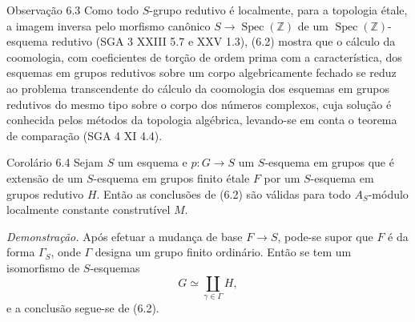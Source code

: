 \begin{statement}{Observação 6.3}
Como todo $S$-grupo redutivo é localmente, para a topologia étale, a imagem inversa pelo morfismo canônico $S\to\operatorname{Spec}(\mathbb Z)$ de um $\operatorname{Spec}(\mathbb Z)$-esquema redutivo (SGA 3 XXIII 5.7 e XXV 1.3), (6.2) mostra que o cálculo da coomologia, com coeficientes de torção de ordem prima com a característica, dos esquemas em grupos redutivos sobre um corpo algebricamente fechado se reduz ao problema transcendente do cálculo da coomologia dos esquemas em grupos redutivos do mesmo tipo sobre o corpo dos números complexos, cuja solução é conhecida pelos métodos da topologia algébrica, levando-se em conta o teorema de comparação (SGA 4 XI 4.4).
\end{statement}

\begin{statement}{Corolário 6.4}
Sejam $S$ um esquema e $p:G\to S$ um $S$-esquema em grupos que é extensão de um $S$-esquema em grupos finito étale $F$ por um $S$-esquema em grupos redutivo $H$. Então as conclusões de (6.2) são válidas para todo $A_S$-módulo localmente constante construtível $M$.
\end{statement}

\emph{Demonstração.} Após efetuar a mudança de base $F\to S$, pode-se supor que $F$ é da forma $\Gamma_S$, onde $\Gamma$ designa um grupo finito ordinário. Então se tem um isomorfismo de $S$-esquemas
\[
G\simeq\coprod_{\gamma\in\Gamma}H,
\]
e a conclusão segue-se de (6.2).
